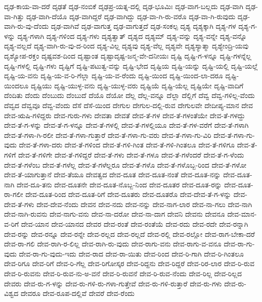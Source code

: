 {ದೃಢ-ಕಾಯ-ವಾ-ದರೆ
ದೃಢತೆ
ದೃಢ-ನಂಬಿಕೆ
ದೃಢಪ್ರ-ಯತ್ನ-ದಲ್ಲಿ
ದೃಢ-ಭೂಮಿಃ
ದೃಢ-ವಾಗ-ಬಲ್ಲದು
ದೃಢ-ವಾಗಿ
ದೃಢ-ವಾ-ಗಿತ್ತು
ದೃಢ-ವಾಗಿ-ದೆಯೊ
ದೃಢ-ವಾಗಿದ್ದರೆ
ದೃಢ-ವಾಗಿದ್ದು
ದೃಢ-ವಾ-ಗಿ-ರು-ವರೊ
ದೃಢ-ವಾ-ಗಿ-ರುವುದು
ದೃಢ-ವಾಗಿ-ರು-ವು-ದೆಂದು
ದೃಢ-ವಾಗಿವೆ
ದೃಢ-ವಾಗುತ್ತ
ದೃಢ-ವಾಗುತ್ತದೆ
ದೃಢ-ಸಂಕಲ್ಪ
ದೃಶ್ಯ
ದೃಶ್ಯಕ್ಕಾಗಿ
ದೃಶ್ಯ-ಗಳ
ದೃಶ್ಯ-ಗ-ಳನ್ನು
ದೃಶ್ಯ-ಗಳಾಗಿ
ದೃಶ್ಯ-ಗಳಿಂದ
ದೃಶ್ಯ-ಗಳು
ದೃಶ್ಯತ್ವಾತ್
ದೃಶ್ಯದ
ದೃಶ್ಯಮ್
ದೃಶ್ಯ-ವನ್ನು
ದೃಶ್ಯ-ವನ್ನೇ
ದೃಶ್ಯ-ವನ್ನೊ
ದೃಶ್ಯ-ವಲ್ಲದೆ
ದೃಶ್ಯ-ವಾಗಿ-ರು-ವು-ದ-ರಿಂದ
ದೃಶ್ಯ-ವಿಲ್ಲ
ದೃಶ್ಯವು
ದೃಶ್ಯ-ವೆಲ್ಲ
ದೃಶ್ಯವೇ
ದೃಶ್ಯಸ್ಯಾತ್ಮಾ
ದೃಶ್ಯೇಂದ್ರಿ-ಯವು
ದೃಶ್ಯೋಪ-ರಕ್ತಂ
ದೃಷ್ಟವಶ-ದಿಂದ
ದೃಷ್ಟಾಂತ
ದೃಷ್ಟಾದೃಷ್ಟ-ಜನ್ಮ-ವೇ-ದನೀಯಃ
ದೃಷ್ಟಿ
ದೃಷ್ಟಿ-ಗ-ಳನ್ನೂ
ದೃಷ್ಟಿ-ಗಳನ್ನೆಲ್ಲ
ದೃಷ್ಟಿ-ಗಳಲ್ಲಿ
ದೃಷ್ಟಿ-ಗಳು
ದೃಷ್ಟಿಗೆ
ದೃಷ್ಟಿ-ಪಟುತ್ವ-ವನ್ನು
ದೃಷ್ಟಿ-ಭೇದ
ದೃಷ್ಟಿಯ
ದೃಷ್ಟಿ-ಯನ್ನು
ದೃಷ್ಟಿ-ಯಲ್ಲಿ
ದೃಷ್ಟಿ-ಯಲ್ಲೆ
ದೃಷ್ಟಿ-ಯ-ವನು
ದೃಷ್ಟಿ-ಯ-ವ-ರಿ-ಗೆಲ್ಲಾ
ದೃಷ್ಟಿ-ಯ-ವ-ರೆಂದು
ದೃಷ್ಟಿ-ಯಿಂದ
ದೃಷ್ಟಿ-ಯಿಂದ-ಲಾ-ದರೂ
ದೃಷ್ಟಿ-ಯಿಂದಲೂ
ದೃಷ್ಟಿಯು
ದೃಷ್ಟಿ-ಯುಳ್ಳ-ವನು
ದೃಷ್ಟಿ-ಯುಳ್ಳ-ವರು
ದೃಷ್ಟಿಯೆ
ದೃಷ್ಟಿ-ಯೆಲ್ಲ
ದೃಷ್ಟಿಯೇ
ದೃಷ್ಟಿ-ವಾದಿಗೆ
ದೆಂದಿತು
ದೆಂದು
ದೆಂಬುದು
ದೆಂಬುದೆ
ದೆಯೊ
ದೆಯೋ
ದೆಲ್ಲ
ದೆಲ್ಲ-ವನ್ನೂ
ದೆಲ್ಲಾ
ದೆಲ್ಲಿಗೆ
ದೆವ್ವ
ದೆವ್ವ-ಗಳಿಲ್ಲ-ವೆಂದು
ದೆವ್ವದ
ದೆವ್ವವೂ
ದೆವ್ವ-ವೆಂದು
ದೆಸೆ
ದೆಸೆ-ಯಿಂದ
ದೇಗುಲ
ದೇಗುಲ-ದಲ್ಲಿ-ರುವ
ದೇಗುಲವೇ
ದೇದೀಪ್ಯ-ಮಾನ
ದೇವ
ದೇವ-ಋಷಿ-ಗಳಿದ್ದರು
ದೇವ-ಗುರು-ಗಳು
ದೇವತಾ
ದೇವತೆ
ದೇವ-ತೆ-ಗಳ
ದೇವ-ತೆ-ಗಳಂತೆಯೇ
ದೇವ-ತೆ-ಗಳದ್ದು
ದೇವ-ತೆ-ಗ-ಳನ್ನು
ದೇವ-ತೆ-ಗ-ಳನ್ನೂ
ದೇವ-ತೆ-ಗಳಲ್ಲಿ
ದೇವ-ತೆ-ಗಳಲ್ಲಿಯೂ
ದೇವ-ತೆ-ಗಳ-ವರೆಗೆ
ದೇವ-ತೆ-ಗಳಾಗಿ
ದೇವ-ತೆ-ಗಳಾ-ಗಿ-ರಲೀ
ದೇವ-ತೆ-ಗಳಾ-ಗುತ್ತಾರೆ
ದೇವ-ತೆ-ಗಳಾ-ಗು-ವರು
ದೇವ-ತೆ-ಗಳಾ-ಗು-ವಿರಿ
ದೇವ-ತೆ-ಗಳಾ-ಗು-ವುದು
ದೇವ-ತೆ-ಗಳಾ-ದರು
ದೇವ-ತೆ-ಗಳಿಂದ
ದೇವ-ತೆ-ಗಳಿ-ಗಿಂತ
ದೇವ-ತೆ-ಗಳಿ-ಗಿಂತಲೂ
ದೇವ-ತೆ-ಗಳಿಗೂ
ದೇವ-ತೆ-ಗಳಿಗೆ
ದೇವ-ತೆ-ಗಳಿಗೇ
ದೇವ-ತೆ-ಗಳಿದ್ದರೆ
ದೇವ-ತೆ-ಗಳು
ದೇವ-ತೆ-ಗಳೂ
ದೇವ-ತೆ-ಗಳೆಂದರೆ
ದೇವ-ತೆ-ಗ-ಳೆಂದು
ದೇವ-ತೆ-ಗಳೆಂಬ
ದೇವ-ತೆ-ಗಳೆಲ್ಲ
ದೇವ-ತೆ-ಗಳೆಲ್ಲರೂ
ದೇವ-ತೆ-ಗಳೊ
ದೇವ-ತೆ-ಗಳೊಬ್ಬ-ರಿಂದ
ದೇವ-ತೆ-ಗಳೋ
ದೇವ-ತೆ-ಯಾಗುತ್ತಾನೆ
ದೇವ-ತೆಯೂ
ದೇವತ್ವದ
ದೇವ-ದೂತ
ದೇವ-ದೂತ-ನಂತೆ
ದೇವ-ದೂತ-ನನ್ನು
ದೇವ-ದೂತ-ನಾಗಿ
ದೇವ-ದೂ-ತನು
ದೇವ-ದೂತನೇ
ದೇವ-ದೂತ-ನೊಬ್ಬ-ನಿಂದ
ದೇವ-ದೂತರ
ದೇವ-ದೂತ-ರನ್ನು
ದೇವ-ದೂತ-ರಾ-ಗಲೀ
ದೇವ-ದೂತ-ರಿಂದ
ದೇವ-ದೂತ-ರಿಗೆ
ದೇವ-ದೂತರು
ದೇವ-ದೂತರೊ
ದೇವ-ದೇವ-ತೆ-ಗ-ಳನ್ನು
ದೇವ-ದೇವ-ತೆ-ಗಳು
ದೇವ-ದೇವ-ನೆಂದು
ದೇವನ
ದೇವ-ನದು
ದೇವ-ನನ್ನು
ದೇವ-ನಾಗ-ಲಾರ
ದೇವ-ನಾ-ಗಲು
ದೇವ-ನಾಗಿ
ದೇವ-ನಾಗಿ-ರುವನು
ದೇವ-ನಾಗು-ವನು
ದೇವ-ನಾ-ದರೋ
ದೇವ-ನಾ-ದಾಗ
ದೇವನಿ
ದೇವನು
ದೇವನೂ
ದೇವ-ಮಾನ-ವ-ರಿಗೆ
ದೇವ-ಯಾನ
ದೇವ-ಯಾನದ
ದೇವರ
ದೇವ-ರಂತೆ
ದೇವ-ರಂತೆಯೆ
ದೇವ-ರದು
ದೇವ-ರದೇ
ದೇವ-ರನ್ನಾಗಿ
ದೇವ-ರನ್ನು
ದೇವ-ರನ್ನೂ
ದೇವ-ರನ್ನೇ
ದೇವ-ರಲ್ಲದ
ದೇವ-ರಲ್ಲದೆ
ದೇವ-ರಲ್ಲಿ
ದೇವ-ರಲ್ಲೋ
ದೇವ-ರಾಗ-ಬೇಕಾ-ದರೆ
ದೇವ-ರಾ-ಗಲಿ
ದೇವ-ರಾಗಿ-ರ-ಲಿಲ್ಲ
ದೇವ-ರಾಗಿ-ರು-ವುದು
ದೇವ-ರಾಗು-ವನು
ದೇವ-ರಾಗು-ವ-ವನೂ
ದೇವ-ರಾ-ಗು-ವುದು
ದೇವ-ರಾ-ಗು-ವುದು-ಇದು
ದೇವ-ರಾದ
ದೇವ-ರಾ-ಯಿತು
ದೇವ-ರಿಂದ
ದೇವ-ರಿ-ಗಾಗಿ
ದೇವ-ರಿ-ಗಿಂತಲೂ
ದೇವ-ರಿಗೂ
ದೇವ-ರಿಗೆ
ದೇವ-ರಿ-ಗೆಲ್ಲ
ದೇವ-ರಿಗೋಸ್ಕರ
ದೇವ-ರಿದ್ದನು
ದೇವ-ರಿದ್ದರೆ
ದೇವ-ರಿರ-ಲಾರ
ದೇವ-ರಿ-ರುವ
ದೇವ-ರಿ-ರುವನು
ದೇವ-ರಿ-ರುವ-ನು-ಅ-ವನೆ
ದೇವ-ರಿ-ರುವನೆ
ದೇವ-ರಿ-ರುವ-ನೆಂದು
ದೇವ-ರಿಲ್ಲ
ದೇವ-ರಿಲ್ಲದ
ದೇವರು
ದೇವ-ರು-ಗ-ಳನ್ನು
ದೇವ-ರು-ಗಳಿ-ರು-ಗಳಾ-ಗುತ್ತೇವೆ
ದೇವ-ರು-ಗಳಿ-ರುತ್ತಾರೆ
ದೇವ-ರು-ಗಳು
ದೇವ-ರು-ವಿಶ್ವದ
ದೇವರೂ
ದೇವ-ರೂಪ-ದಲ್ಲಿವೆ
ದೇವರೆ
ದೇವ-ರೆಂದು
}
